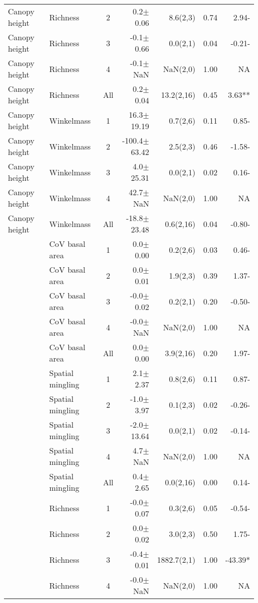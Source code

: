 \begin{longtable}{llcrrS[table-format=1.2]r}
  Canopy height & Richness & 2 & 0.2$\pm$0.06 & 8.6(2,3) & 0.74 & 2.94- \\ 
  Canopy height & Richness & 3 & -0.1$\pm$0.66 & 0.0(2,1) & 0.04 & -0.21- \\ 
  Canopy height & Richness & 4 & -0.1$\pm$NaN & NaN(2,0) & 1.00 & NA \\ 
  Canopy height & Richness & All & 0.2$\pm$0.04 & 13.2(2,16) & 0.45 & 3.63** \\ 
   \midrule
Canopy height & Winkelmass & 1 & 16.3$\pm$19.19 & 0.7(2,6) & 0.11 & 0.85- \\ 
  Canopy height & Winkelmass & 2 & -100.4$\pm$63.42 & 2.5(2,3) & 0.46 & -1.58- \\ 
  Canopy height & Winkelmass & 3 & 4.0$\pm$25.31 & 0.0(2,1) & 0.02 & 0.16- \\ 
  Canopy height & Winkelmass & 4 & 42.7$\pm$NaN & NaN(2,0) & 1.00 & NA \\ 
  Canopy height & Winkelmass & All & -18.8$\pm$23.48 & 0.6(2,16) & 0.04 & -0.80- \\ 
   \midrule
 & CoV basal area & 1 & 0.0$\pm$0.00 & 0.2(2,6) & 0.03 & 0.46- \\ 
   & CoV basal area & 2 & 0.0$\pm$0.01 & 1.9(2,3) & 0.39 & 1.37- \\ 
   & CoV basal area & 3 & -0.0$\pm$0.02 & 0.2(2,1) & 0.20 & -0.50- \\ 
   & CoV basal area & 4 & -0.0$\pm$NaN & NaN(2,0) & 1.00 & NA \\ 
   & CoV basal area & All & 0.0$\pm$0.00 & 3.9(2,16) & 0.20 & 1.97- \\ 
   \midrule
 & Spatial mingling & 1 & 2.1$\pm$2.37 & 0.8(2,6) & 0.11 & 0.87- \\ 
   & Spatial mingling & 2 & -1.0$\pm$3.97 & 0.1(2,3) & 0.02 & -0.26- \\ 
   & Spatial mingling & 3 & -2.0$\pm$13.64 & 0.0(2,1) & 0.02 & -0.14- \\ 
   & Spatial mingling & 4 & 4.7$\pm$NaN & NaN(2,0) & 1.00 & NA \\ 
   & Spatial mingling & All & 0.4$\pm$2.65 & 0.0(2,16) & 0.00 & 0.14- \\ 
   \midrule
 & Richness & 1 & -0.0$\pm$0.07 & 0.3(2,6) & 0.05 & -0.54- \\ 
   & Richness & 2 & 0.0$\pm$0.02 & 3.0(2,3) & 0.50 & 1.75- \\ 
   & Richness & 3 & -0.4$\pm$0.01 & 1882.7(2,1) & 1.00 & -43.39* \\ 
   & Richness & 4 & -0.0$\pm$NaN & NaN(2,0) & 1.00 & NA \\ 

\end{longtable}
